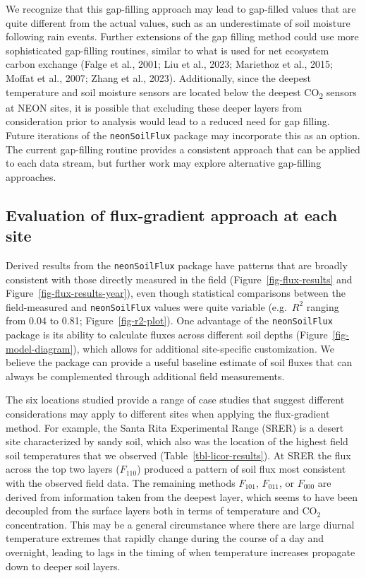 \documentclass[
  letterpaper,
  DIV=11,
  numbers=noendperiod]{scrartcl}
\begin{document}
We recognize that this gap-filling approach may lead to gap-filled
values that are quite different from the actual values, such as an
underestimate of soil moisture following rain events. Further extensions
of the gap filling method could use more sophisticated gap-filling
routines, similar to what is used for net ecosystem carbon exchange
(Falge et al., 2001; Liu et al., 2023; Mariethoz et al., 2015; Moffat et
al., 2007; Zhang et al., 2023). Additionally, since the deepest
temperature and soil moisture sensors are located below the deepest
CO\textsubscript{2} sensors at NEON sites, it is possible that excluding
these deeper layers from consideration prior to analysis would lead to a
reduced need for gap filling. Future iterations of the
\texttt{neonSoilFlux} package may incorporate this as an option. The
current gap-filling routine provides a consistent approach that can be
applied to each data stream, but further work may explore alternative
gap-filling approaches.

\subsection{Evaluation of flux-gradient approach at each
site}\label{evaluation-of-flux-gradient-approach-at-each-site}

Derived results from the \texttt{neonSoilFlux} package have patterns
that are broadly consistent with those directly measured in the field
(Figure~\ref{fig-flux-results} and Figure~\ref{fig-flux-results-year}),
even though statistical comparisons between the field-measured and
\texttt{neonSoilFlux} values were quite variable (e.g.~\(R^{2}\) ranging
from 0.04 to 0.81; Figure~\ref{fig-r2-plot}). One advantage of the
\texttt{neonSoilFlux} package is its ability to calculate fluxes across
different soil depths (Figure~\ref{fig-model-diagram}), which allows for
additional site-specific customization. We believe the package can
provide a useful baseline estimate of soil fluxes that can always be
complemented through additional field measurements.

The six locations studied provide a range of case studies that suggest
different considerations may apply to different sites when applying the
flux-gradient method. For example, the Santa Rita Experimental Range
(SRER) is a desert site characterized by sandy soil, which also was the
location of the highest field soil temperatures that we observed
(Table~\ref{tbl-licor-results}). At SRER the flux across the top two
layers (\(F_{110}\)) produced a pattern of soil flux most consistent
with the observed field data. The remaining methods \(F_{101}\),
\(F_{011}\), or \(F_{000}\) are derived from information taken from the
deepest layer, which seems to have been decoupled from the surface
layers both in terms of temperature and CO\(_{2}\) concentration. This
may be a general circumstance where there are large diurnal temperature
extremes that rapidly change during the course of a day and overnight,
leading to lags in the timing of when temperature increases propagate
down to deeper soil layers.
\end{document}
